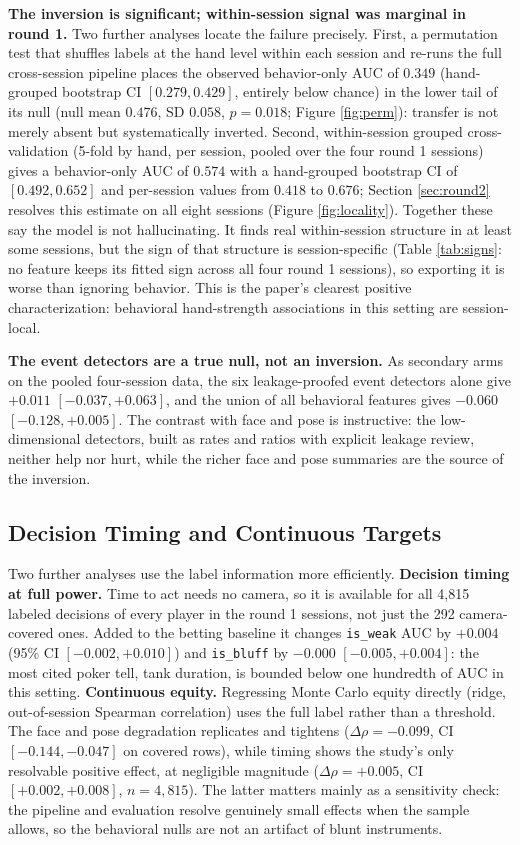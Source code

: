 \documentclass[conference]{IEEEtran}
\begin{document}
\textbf{The inversion is significant; within-session signal was marginal
in round 1.} Two further analyses locate the failure precisely. First, a
permutation test that shuffles labels at the hand level within each
session and re-runs the full cross-session pipeline places the observed
behavior-only AUC of $0.349$ (hand-grouped bootstrap CI $[0.279, 0.429]$,
entirely below chance) in the lower tail of its null (null mean $0.476$,
SD $0.058$, $p = 0.018$; Figure \ref{fig:perm}): transfer is not merely
absent but systematically inverted. Second, within-session grouped
cross-validation (5-fold by hand, per session, pooled over the four
round 1 sessions) gives a behavior-only AUC of $0.574$ with a
hand-grouped bootstrap CI of $[0.492, 0.652]$ and per-session values
from $0.418$ to $0.676$; Section \ref{sec:round2} resolves this estimate
on all eight sessions (Figure \ref{fig:locality}). Together these say
the model is not hallucinating. It finds real within-session structure
in at least some sessions, but the sign of that structure is
session-specific (Table \ref{tab:signs}: no feature keeps its fitted
sign across all four round 1 sessions), so exporting it is worse than
ignoring behavior. This is the paper's clearest positive
characterization: behavioral hand-strength associations in this setting
are session-local.

\textbf{The event detectors are a true null, not an inversion.} As
secondary arms on the pooled four-session data, the six leakage-proofed
event detectors alone give $+0.011$ $[-0.037, +0.063]$, and the union of
all behavioral features gives $-0.060$ $[-0.128, +0.005]$. The contrast
with face and pose is instructive: the low-dimensional detectors, built
as rates and ratios with explicit leakage review, neither help nor hurt,
while the richer face and pose summaries are the source of the inversion.

\subsection{Decision Timing and Continuous Targets}

Two further analyses use the label information more efficiently.
\textbf{Decision timing at full power.} Time to act needs no camera, so
it is available for all 4{,}815 labeled decisions of every player in the
round 1 sessions, not just the 292 camera-covered ones. Added to the
betting baseline it changes \texttt{is\_weak} AUC by $+0.004$ (95\% CI
$[-0.002, +0.010]$) and \texttt{is\_bluff} by $-0.000$
$[-0.005, +0.004]$: the most cited poker tell, tank duration, is bounded
below one hundredth of AUC in this setting. \textbf{Continuous equity.}
Regressing Monte Carlo equity directly (ridge, out-of-session Spearman
correlation) uses the full label rather than a threshold. The face and
pose degradation replicates and tightens ($\Delta\rho = -0.099$, CI
$[-0.144, -0.047]$ on covered rows), while timing shows the study's only
resolvable positive effect, at negligible magnitude
($\Delta\rho = +0.005$, CI $[+0.002, +0.008]$, $n = 4{,}815$). The
latter matters mainly as a sensitivity check: the pipeline and
evaluation resolve genuinely small effects when the sample allows, so
the behavioral nulls are not an artifact of blunt instruments.
\end{document}
